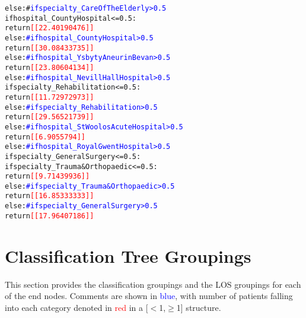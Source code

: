\documentclass[thesis.tex]{subfiles}
\begin{document}
{\begin{alltt}
                        else:  #\textcolor{blue}{ if specialty_Care Of The Elderly > 0.5}
                            if hospital_County Hospital <= 0.5:
                                return \textcolor{red}{[[22.40190476]]}
                            else:  \textcolor{blue}{# if hospital_County Hospital > 0.5}
                                return \textcolor{red}{[[30.08433735]]}
                    else:  \textcolor{blue}{# if hospital_Ysbyty Aneurin Bevan > 0.5}
                        return \textcolor{red}{[[23.80604134]]}
                else:  \textcolor{blue}{# if hospital_Nevill Hall Hospital > 0.5}
                    if specialty_Rehabilitation <= 0.5:
                        return \textcolor{red}{[[11.72972973]]}
                    else: \textcolor{blue}{# if specialty_Rehabilitation > 0.5}
                        return \textcolor{red}{[[29.56521739]]}
            else: \textcolor{blue}{# if hospital_St Woolos Acute Hospital > 0.5}
                return \textcolor{red}{[[6.9055794]]}
        else:  \textcolor{blue}{# if hospital_Royal Gwent Hospital > 0.5}
            if specialty_General Surgery <= 0.5:
                if specialty_Trauma & Orthopaedic <= 0.5:
                    return \textcolor{red}{[[9.71439936]]}
                else: \textcolor{blue}{# if specialty_Trauma & Orthopaedic > 0.5}
                    return \textcolor{red}{[[16.85333333]]}
            else:  \textcolor{blue}{# if specialty_General Surgery > 0.5}
                return \textcolor{red}{[[17.96407186]]}
\end{alltt}}

\section{Classification Tree Groupings}\label{app:secclassification}
\normalsize
This section provides the classification groupings and the LOS groupings for each of the end nodes. Comments are shown in \textcolor{blue}{blue}, with number of patients falling into each category denoted in \textcolor{red}{red} in a [$<$1,$\geq$1] structure. 
\end{document}
